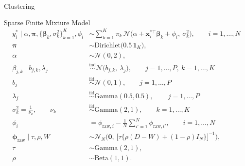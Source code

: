 \begin{section}{Clustering}
\begin{frame}{Sparse Finite Mixture Model}
\tiny
\begin{align*}
y_i^\ast \mid \alpha,\boldsymbol{\pi},\{\boldsymbol{\beta}_k,\sigma_k^2\}_{k=1}^K,\phi_i
&\sim \sum_{k=1}^K \pi_k\,
\mathcal{N}\!\Big(\alpha+\mathbf{x}_i^{\ast\top}\boldsymbol{\beta}_k+\phi_i,\ \sigma_k^2\Big),
\qquad i=1,\dots,N\\
\boldsymbol{\pi} &\sim \mathrm{Dirichlet}\!\big(0.5\,\mathbf{1}_K\big),\\
\alpha &\sim \mathcal{N}(0,2),\\
\beta_{j,k}\mid b_{j,k},\lambda_{j}
&\stackrel{\text{ind}}{\sim} \mathcal{N}\!\Big(b_{j,k},\ \lambda_{j} \Big),
\qquad j=1,\dots,P,\ k=1,\dots,K\\
b_{j} &\stackrel{\text{iid}}{\sim} \mathcal{N}(0,1),
\qquad j=1,\dots,P\\
\lambda_{j} &\stackrel{\text{iid}}{\sim} \mathrm{Gamma}(0.5,0.5), \,
\qquad j=1,\dots,P\\
\sigma^2_k = \frac{1}{\nu_k}, \qquad \nu_k &\stackrel{\text{iid}}{\sim} \mathrm{Gamma}(2,1),
\qquad k=1,\dots,K\\
\phi_i &= \phi_{\mathrm{raw},i}-\frac1N\sum_{i'=1}^N \phi_{\mathrm{raw},i'},
\qquad i=1,\dots,N\\
\boldsymbol{\phi}_{\mathrm{raw}}\mid \tau,\rho,W
&\sim \mathcal{N}_N\!\Big(
\mathbf{0},\ \big[\tau\{\rho(D-W)+(1-\rho)I_N\}\big]^{-1}
\Big),\\
\tau &\sim \mathrm{Gamma}(2,1),\\
\rho &\sim \mathrm{Beta}(1,1).
\end{align*}

\end{frame}


\end{section}
